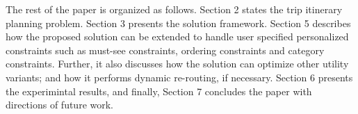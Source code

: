 The rest of the paper is organized as follows. Section 2 states the trip itinerary planning problem. Section 3 presents the \trip solution framework. Section 5 describes how the proposed solution can be extended to handle user specified personalized constraints such as must-see constraints, ordering constraints and category constraints. Further, it also discusses how the \trip solution  can optimize other utility variants; and how it performs dynamic re-routing, if necessary. Section 6 presents the experimintal results, and finally, Section 7 concludes the paper with directions of future work.

